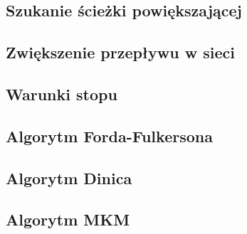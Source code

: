 \subsection{Szukanie ścieżki powiększającej}
\subsection{Zwiększenie przepływu w sieci}
\subsection{Warunki stopu}
\subsection{Algorytm Forda-Fulkersona}
\subsection{Algorytm Dinica}
\subsection{Algorytm MKM}
